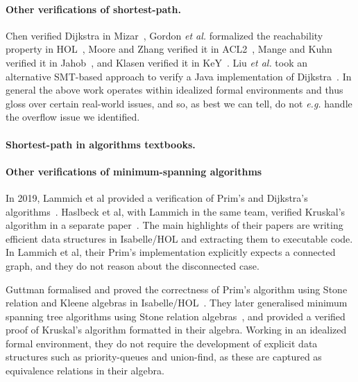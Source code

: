 \paragraph{Other verifications of shortest-path.}
Chen verified Dijkstra in Mizar~\cite{chen2003dijkstra}, Gordon \emph{et al.} formalized the reachability property in HOL~\cite{gordon2003executing}, Moore and Zhang verified it in ACL2~\cite{Moore2005}, Mange and Kuhn verified it in Jahob~\cite{mange2007verifying}, and Klasen verified it in KeY~\cite{klasen2010verifying}.  Liu \emph{et al.} took an alternative SMT-based approach to verify a Java implementation of Dijkstra~\cite{6200101}.  In general the above work operates within
idealized formal environments and thus gloss over certain real-world issues, and so, as best we
can tell, do not \emph{e.g.} handle the overflow issue we identified.



\paragraph{Shortest-path in algorithms textbooks.}


\paragraph{Other verifications of minimum-spanning algorithms}In 2019, Lammich et al provided a verification of Prim's and Dijkstra's algorithms~\cite{DBLP:journals/afp/LammichN19}. Haslbeck et al, with Lammich in the same team, verified Kruskal's algorithm in a separate paper~\cite{DBLP:journals/afp/HaslbeckLB19}. The main highlights of their papers are writing efficient data structures in Isabelle/HOL and extracting them to executable code. In Lammich et al, their Prim's implementation explicitly expects a connected graph, and they do not reason about the disconnected case.

Guttman formalised and proved the correctness of Prim's algorithm using Stone relation and Kleene algebras in Isabelle/HOL~\cite{DBLP:conf/ictac/Guttmann16}. They later generalised minimum spanning tree algorithms using Stone relation algebras~\cite{DBLP:journals/jlp/Guttmann18}, and provided a verified proof of Kruskal's algorithm formatted in their algebra. Working in an idealized formal environment, they do not require the development of explicit data structures such as priority-queues and union-find, as these are captured as equivalence relations in their algebra.

